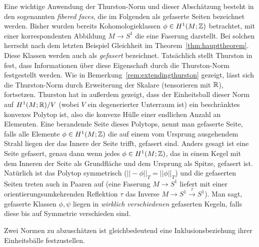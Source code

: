     \begin{bsp}
    \label{ex:fiberedfaces}
        Eine wichtige Anwendung der Thurston-Norm und dieser Abschätzung besteht in den sogenannten \textit{fibered faces}, die im Folgenden als gefaserte Seiten bezeichnet werden. Bisher wurden bereits Kohomologieklassen $\phi \in H^1(M;\mathbb{Z})$ betrachtet, mit einer korrespondenten Abbildung $M \to S^1$ die eine Faserung darstellt. Bei solchen herrscht nach dem letzten Beispiel Gleichheit im Theorem~\ref{thm:haupttheorem}. Diese Klassen werden auch als \textit{gefasert} bezeichnet. Tatsächlich stellt Thurston in \cite{Thurston.1986} fest, dass Informationen über diese Eigenschaft durch die Thurston-Norm festgestellt werden. Wie in Bemerkung~\ref{rem:extendingthurston} gezeigt, lässt sich die Thurston-Norm durch Erweiterung der Skalare (tensorieren mit $\mathbb{R}$), fortsetzen. Thurston hat in \cite{Thurston.1986} außerdem gezeigt, dass der Einheitsball dieser Norm auf $H^1(M;\mathbb{R})/V$ (wobei $V$ ein degenerierter Unterraum ist) ein beschränktes konvexes Polytop ist, also die konvexe Hülle einer endlichen Anzahl an Elementen. Eine berandende Seite dieses Polytops, nennt man gefaserte Seite, falls alle Elemente $\phi \in H^1(M;\mathbb{Z})$ die auf einem vom Ursprung ausgehendem Strahl liegen der das Innere der Seite trifft, gefasert sind. Anders gesagt ist eine Seite gefasert, genau dann wenn jedes $\phi \in H^1(M;\mathbb{Z})$, das in einem Kegel mit dem Inneren der Seite als Grundfläche und dem Ursprung als Spitze, gefasert ist. Natürlich ist das Polytop symmetrisch ($||-\phi||_T=||\phi||_T$) und die gefaserten Seiten treten auch in Paaren auf (eine Faserung $M \to S^1$ liefert mit einer orientierungsumkehrenden Reflektion $\tau$ das Inverse $M \to S^1 \stackrel \tau \to S^1$). Man sagt, gefaserte Klassen $\phi,\psi$ liegen in \textit{wirklich verschiedenen} gefaserten Kegeln, falls diese bis auf Symmetrie verschieden sind. 
    \end{bsp}

    \begin{bem}
        Zwei Normen zu abzuschätzen ist gleichbedeutend eine Inklusionsbeziehung ihrer Einheitsbälle festzustellen.
    \end{bem}


